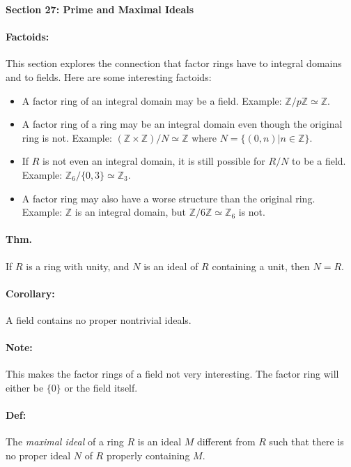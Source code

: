 \documentclass[10pt,a4paper]{article}
\begin{document}
\begin{center}
\textbf{Section 27: Prime and Maximal Ideals}
\end{center}

\paragraph{Factoids:} This section explores the connection that factor rings have to integral domains and to fields. Here are some interesting factoids:
\begin{itemize}
\item A factor ring of an integral domain may be a field. Example: $\mathbb{Z}/p\mathbb{Z} \simeq \mathbb{Z}$.
\item A factor ring of a ring may be an integral domain even though the original ring is not. Example: $(\mathbb{Z} \times \mathbb{Z})/N \simeq \mathbb{Z}$ where $N = \{(0,n)|n \in \mathbb{Z}\}$.
\item If $R$ is not even an integral domain, it is still possible for $R/N$ to be a field. Example: $\mathbb{Z}_6/\{0,3\} \simeq \mathbb{Z}_3$.
\item A factor ring may also have a worse structure than the original ring. Example: $\mathbb{Z}$ is an integral domain, but $\mathbb{Z}/6\mathbb{Z} \simeq \mathbb{Z}_6$ is not.
\end{itemize}

\paragraph{Thm.} If $R$ is a ring with unity, and $N$ is an ideal of $R$ containing a unit, then $N=R$.

\paragraph{Corollary:} A field contains no proper nontrivial ideals.

\paragraph{Note:} This makes the factor rings of a field not very interesting. The factor ring will either be $\{0\}$ or the field itself.

\paragraph{Def:} The \textit{maximal ideal} of a ring $R$ is an ideal $M$ different from $R$ such that there is no proper ideal $N$ of $R$ properly containing $M$.
\end{document}
